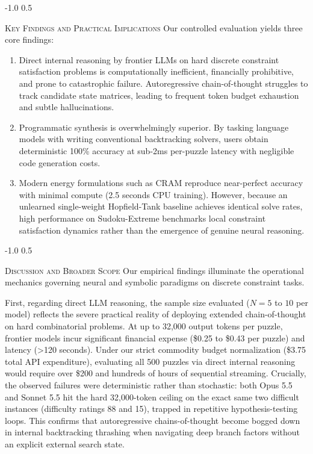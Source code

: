 \documentclass{article} %
\makeatletter
\renewcommand{\subsection}{\@startsection{subsection}{2}{\z@}%
  {-1.0\baselineskip}%
  {0.5\baselineskip}%
  {\normalfont\fontsize{10}{11}\selectfont\raggedright\scshape}}
\makeatother
\begin{document}
\subsection{\textsc{Key Findings and Practical Implications}}
Our controlled evaluation yields three core findings:
\begin{enumerate}
    \item Direct internal reasoning by frontier LLMs on hard discrete constraint satisfaction problems is computationally inefficient, financially prohibitive, and prone to catastrophic failure. Autoregressive chain-of-thought struggles to track candidate state matrices, leading to frequent token budget exhaustion and subtle hallucinations.
    \item Programmatic synthesis is overwhelmingly superior. By tasking language models with writing conventional backtracking solvers, users obtain deterministic 100\% accuracy at sub-2ms per-puzzle latency with negligible code generation costs.
    \item Modern energy formulations such as CRAM reproduce near-perfect accuracy with minimal compute (2.5 seconds CPU training). However, because an unlearned single-weight Hopfield-Tank baseline achieves identical solve rates, high performance on Sudoku-Extreme benchmarks local constraint satisfaction dynamics rather than the emergence of genuine neural reasoning.
\end{enumerate}

\subsection{\textsc{Discussion and Broader Scope}}
\label{sec:discussion}
Our empirical findings illuminate the operational mechanics governing neural and symbolic paradigms on discrete constraint tasks.

First, regarding direct LLM reasoning, the sample size evaluated ($N=5$ to $10$ per model) reflects the severe practical reality of deploying extended chain-of-thought on hard combinatorial problems. At up to 32,000 output tokens per puzzle, frontier models incur significant financial expense (\$0.25 to \$0.43 per puzzle) and latency (>120 seconds). Under our strict commodity budget normalization (\$3.75 total API expenditure), evaluating all 500 puzzles via direct internal reasoning would require over \$200 and hundreds of hours of sequential streaming. Crucially, the observed failures were deterministic rather than stochastic: both Opus 5.5 and Sonnet 5.5 hit the hard 32,000-token ceiling on the exact same two difficult instances (difficulty ratings 88 and 15), trapped in repetitive hypothesis-testing loops. This confirms that autoregressive chains-of-thought become bogged down in internal backtracking thrashing when navigating deep branch factors without an explicit external search state.
\end{document}
